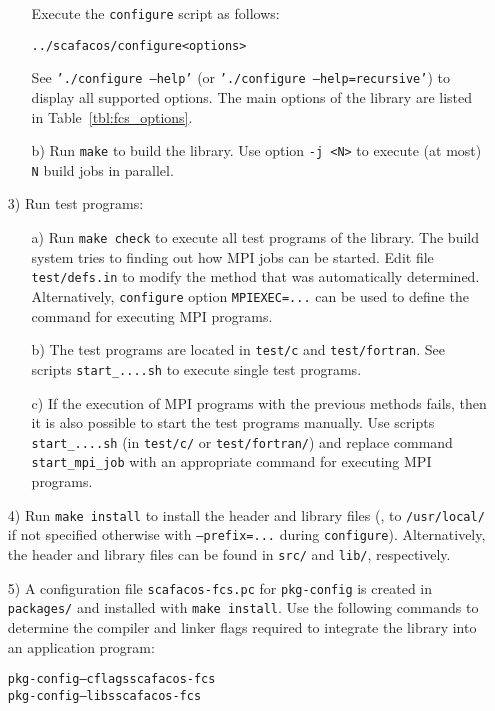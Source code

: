 \begin{enumerate}
\begin{enumerate}
Execute the \texttt{configure} script as follows:
\begin{alltt}
  ../scafacos/configure <options>
\end{alltt}

See \texttt{'./configure --help'} (or \texttt{'./configure --help=recursive'}) to display all supported options.
The main options of the library are listed in Table~\ref{tbl:fcs_options}.

  \item[b)]
Run \texttt{make} to build the library.
Use option \texttt{-j <N>} to execute (at most) \texttt{N} build jobs in parallel.
  \end{enumerate}

  \item[3)] Run test programs:
  \begin{enumerate}
    \item[a)]
Run \texttt{make check} to execute all test programs of the library.
The build system tries to finding out how MPI jobs can be started.
Edit file \texttt{test/defs.in} to modify the method that was automatically determined.
Alternatively, \texttt{configure} option \texttt{MPIEXEC=...} can be used to define the command for executing MPI programs.

    \item[b)]
The test programs are located in \texttt{test/c} and \texttt{test/fortran}.
See scripts \texttt{start\_....sh} to execute single test programs.

    \item[c)]
If the execution of MPI programs with the previous methods fails, then it is also possible to start the test programs manually.
Use scripts \texttt{start\_....sh} (in \texttt{test/c/} or \texttt{test/fortran/}) and replace command \texttt{start\_mpi\_job} with an appropriate command for executing MPI programs.
  \end{enumerate}

  \item[4)]
Run \texttt{make install} to install the header and library files (\ie, to \texttt{/usr/local/} if not specified otherwise with \texttt{--prefix=...} during \texttt{configure}).
Alternatively, the header and library files can be found in \texttt{src/} and \texttt{lib/}, respectively.

  \item[5)]
A configuration file \texttt{scafacos-fcs.pc} for \texttt{pkg-config} is created in \texttt{packages/} and installed with \texttt{make install}.
Use the following commands to determine the compiler and linker flags required to integrate the library into an application program:
\begin{alltt}
  pkg-config --cflags scafacos-fcs
  pkg-config --libs scafacos-fcs
\end{alltt}

\end{enumerate}

